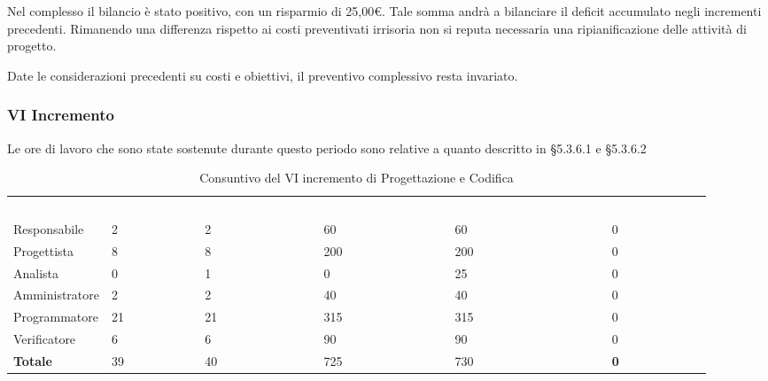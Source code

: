 Nel complesso il bilancio è stato positivo, con un risparmio di 25,00\euro. Tale somma andrà a bilanciare il deficit accumulato negli incrementi precedenti. Rimanendo una differenza rispetto ai costi preventivati irrisoria non si reputa necessaria una ripianificazione delle attività di progetto.

Date le considerazioni precedenti su costi e obiettivi, il preventivo complessivo resta invariato.


\pagebreak


\subsubsection{VI Incremento}
Le ore di lavoro che sono state sostenute durante questo periodo sono relative a quanto descritto in §5.3.6.1 e §5.3.6.2

\begin{table}[H]
\begin{center}
\renewcommand{\arraystretch}{1.5}
\begin{tabular}{ m{}<{\centering}  m{}<{\centering} m{}<{\centering} m{}<{\centering} m{}<{\centering} m{}<{\centering}}
	\rowcolor{darkblue}
	\textcolor{white}{\textbf{Ruolo}} & \textcolor{white}{\textbf{Ore Effettive}} & \textcolor{white}{\textbf{Ore Preventivate}}&\textcolor{white}{\textbf{Costo Effettivo (\euro)}}&\textcolor{white}{\textbf{Costo Preventivato (\euro)}}&\textcolor{white}{\textbf{Differenza (\euro)}}\\ 

	Responsabile  & 2 & 2 & 60 & 60 & 0\\	
	
	Progettista & 8 & 8 & 200 & 200 & 0\\
	
	Analista & 0 & 1 & 0 & 25 & 0\\
	
	Amministratore & 2 & 2 & 40 & 40 & 0\\
	
	Programmatore & 21 & 21 & 315 & 315 & 0\\
	
	Verificatore & 6 & 6 & 90 & 90 & 0\\
	
	\textbf{Totale} & 39 & 40 & 725 & 730 & \textbf{0} \\
	
\end{tabular}
\caption{Consuntivo del VI incremento di Progettazione e Codifica}
\end{center}
\end{table}

